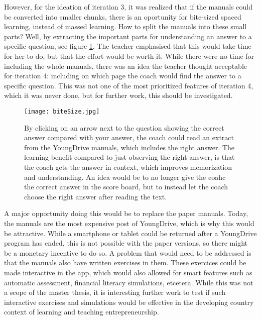 However, for the ideation of iteration 3, it was realized that if the manuals could be converted into smaller chunks, there is an oportunity for bite-sized spaced learning, instead of massed learning. How to split the manuals into these small parts? Well, by extracting the important parts for understanding an answer to a specific question, see figure \ref{fig:bite-size}. The teacher emphasised that this would take time for her to do, but that the effort would be worth it. While there were no time for including the whole manuals, there was an idea the teacher thought acceptable for iteration 4: including on which page the coach would find the answer to a specific question. This was not one of the most prioritized features of iteration 4, which it was never done, but for further work, this should be investigated.

\begin{figure}[h]
    \centering
    \texttt{[image: biteSize.jpg]}
    \caption{By clicking on an arrow next to the question showing the correct answer compared with your answer, the coach could read an extract from the YoungDrive manuals, which includes the right answer. The learning benefit compared to just observing the right answer, is that the coach gets the answer in context, which improves memorization and understanding. An idea would be to no longer give the coahc the correct answer in the score board, but to instead let the coach choose the right answer after reading the text.}
    \label{fig:bite-size}
\end{figure}

A major opportunity doing this would be to replace the paper manuals. Today, the manuals are the most expensive post of YoungDrive, which is why this would be attractive. While a smartphone or tablet could be returned after a YoungDrive program has ended, this is not possible with the paper versions, so there might be a monetary incentive to do so. A problem that would need to be addressed is that the manuals also have written exercises in them. These exercices could be made interactive in the app, which would also allowed for smart features such as automatic assessment, financial literacy simulations, etcetera. While this was not a scope of the master thesis, it is interesting further work to test if such interactive exercises and simulations would be effective in the developing country context of learning and teaching entrepreneurship.
